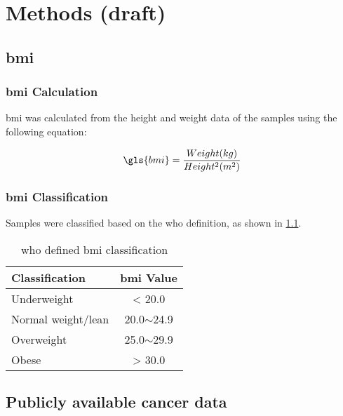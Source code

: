 \chapter{Methods (draft)}
\label{ch:methods}

\section{\gls{bmi}}
\label{sec:bmi}

\subsection{\gls{bmi} Calculation}
\label{subsec:bmicalc}

\gls{bmi} was calculated from the height and weight data of the samples using the following equation:

\begin{equation}
	\label{eq:bmicalc}
	\gls{bmi} = \frac{Weight (kg)}{Height^2(m^2)}\\
\end{equation}

\subsection{\gls{bmi} Classification}
\label{subsec:bmiclassification}

Samples were classified based on the \gls{who} definition, as shown in \cref{tab:whobmiclass}.
\begin{table}[hb]
	\caption{\gls{who} defined \gls{bmi} classification}
	\label{tab:whobmiclass}
	\begin{center}
		\begin{tabular}{lc}
			\bfseries {Classification} & \bfseries {\gls{bmi} Value}\\
			\hline
			\rule{0pt}{2.25ex}Underweight & \textless{} 20.0\\
			Normal weight/lean & 20.0$\sim$24.9\\
			Overweight & 25.0$\sim$29.9\\
			Obese & \textgreater{} 30.0\\
		\end{tabular}
	\end{center}
\end{table}

\section{Publicly available cancer data}
\label{sec:data}

